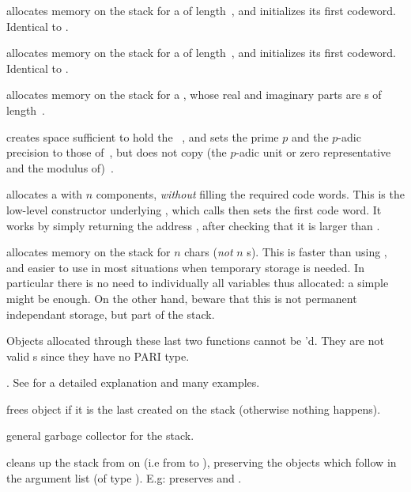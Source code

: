  allocates memory on the stack for a 
of length~, and initializes its first codeword. Identical to
.

 allocates memory on the stack for a 
of length~, and initializes its first codeword. Identical to
.

 allocates memory on the stack for a
, whose real and imaginary parts are s
of length~.

 creates space sufficient to hold the
~, and sets the prime $p$ and the $p$-adic precision to
those of~, but does not copy (the $p$-adic unit or zero representative
and the modulus of)~.

 allocates a  with $n$ components,
\emph{without} filling the required code words. This is the low-level
constructor underlying , which calls  then sets
the first code word. It works by simply returning the address
, after checking that it is larger than .

 allocates memory on the stack for $n$
chars (\emph{not} $n$ s). This is faster than using ,
and easier to use in most situations when temporary storage is needed. In
particular there is no need to  individually all variables thus
allocated: a simple  might be enough. On the other hand,
beware that this is not permanent independant storage, but part of the stack.

\noindent Objects allocated through these last two functions cannot be
'd. They are not valid s since they have no PARI type.

.
See  for a detailed explanation and many examples.

 frees object  if it is the last created on the
stack (otherwise nothing happens).

 general garbage collector
for the stack.

 cleans up the stack from
 on (i.e from  to ), preserving the  objects
which follow in the argument list (of type ). E.g:
 preserves  and .

